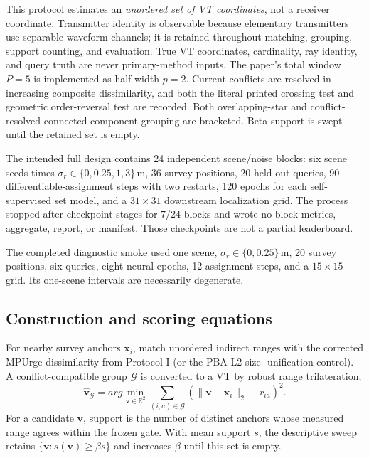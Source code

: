 \documentclass[10pt]{article}
\newcommand{\R}{\mathbb R}
\newcommand{\m}{\,\mathrm m}
\begin{document}
This protocol estimates an \emph{unordered set of VT coordinates}, not a
receiver coordinate.  Transmitter identity is observable because elementary
transmitters use separable waveform channels; it is retained throughout
matching, grouping, support counting, and evaluation.  True VT coordinates,
cardinality, ray identity, and query truth are never primary-method inputs.
The paper's total window $P=5$ is implemented as half-width $p=2$.  Current
conflicts are resolved in increasing composite dissimilarity, and both the
literal printed crossing test and geometric order-reversal test are recorded.
Both overlapping-star and conflict-resolved connected-component grouping are
bracketed.  Beta support is swept until the retained set is empty.

The intended full design contains 24 independent scene/noise blocks: six scene
seeds times $\sigma_r\in\{0,0.25,1,3\}\m$, 36 survey positions, 20 held-out
queries, 90 differentiable-assignment steps with two restarts, 120 epochs for
each self-supervised set model, and a $31\times31$ downstream localization
grid.  The process stopped after checkpoint stages for 7/24 blocks and wrote
no block metrics, aggregate, report, or manifest.  Those checkpoints are not a
partial leaderboard.

The completed diagnostic smoke used one scene, $\sigma_r\in\{0,0.25\}\m$,
20 survey positions, six queries, eight neural epochs, 12 assignment steps,
and a $15\times15$ grid.  Its one-scene intervals are necessarily degenerate.

\subsection{Construction and scoring equations}

For nearby survey anchors $\mathbf x_i$, match unordered indirect ranges with
the corrected MPUrge dissimilarity from Protocol I (or the PBA L2 size-
unification control).  A conflict-compatible group $\mathcal G$ is converted
to a VT by robust range trilateration,
\begin{equation}
 \widehat{\mathbf v}_{\mathcal G}=arg\min_{\mathbf v\in\R^2}
 \sum_{(i,a)\in\mathcal G}
 \left(\|\mathbf v-\mathbf x_i\|_2-r_{ia}\right)^2.
\end{equation}
For a candidate $\mathbf v$, support is the number of distinct anchors whose
measured range agrees within the frozen gate.  With mean support $\bar s$, the
descriptive sweep retains $\{\mathbf v:s(\mathbf v)\ge\beta\bar s\}$ and
increases $\beta$ until this set is empty.
\end{document}
